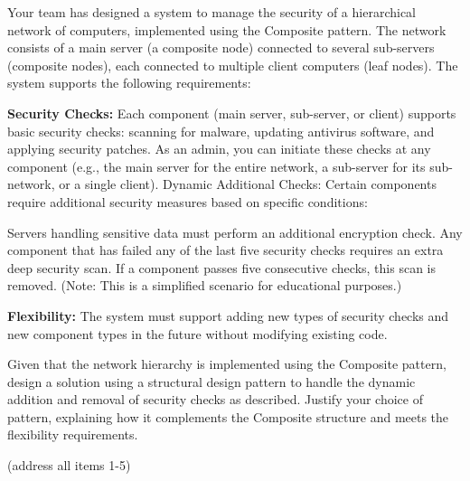 \question[15] Your team has designed a system to manage the security of a hierarchical network of computers, implemented using the Composite pattern. The network consists of a main server (a composite node) connected to several sub-servers (composite nodes), each connected to multiple client computers (leaf nodes). The system supports the following requirements:

{\bf Security Checks:} Each component (main server, sub-server, or client) supports basic security checks: scanning for malware, updating antivirus software, and applying security patches. As an admin, you can initiate these checks at any component (e.g., the main server for the entire network, a sub-server for its sub-network, or a single client).
Dynamic Additional Checks: Certain components require additional security measures based on specific conditions:

Servers handling sensitive data must perform an additional encryption check.
Any component that has failed any of the last five security checks requires an extra deep security scan. If a component passes five consecutive checks, this scan is removed. (Note: This is a simplified scenario for educational purposes.)


{\bf Flexibility:} The system must support adding new types of security checks and new component types in the future without modifying existing code.

Given that the network hierarchy is implemented using the Composite pattern, design a solution using a structural design pattern to handle the dynamic addition and removal of security checks as described. Justify your choice of pattern, explaining how it complements the Composite structure and meets the flexibility requirements.

(address all items 1-5)

\clearpage
